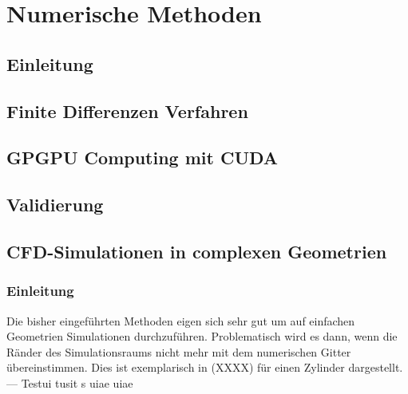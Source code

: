 \chapter{Numerische Methoden}
\section{Einleitung}
\section{Finite Differenzen Verfahren}
\section{GPGPU Computing mit CUDA}
\section{Validierung}
\section{CFD-Simulationen in complexen Geometrien}

\subsection{Einleitung}
Die bisher eingeführten Methoden eigen sich sehr gut um auf einfachen Geometrien Simulationen durchzuführen.
Problematisch wird es dann, wenn die Ränder des Simulationsraums nicht mehr mit dem numerischen Gitter übereinstimmen.
Dies ist exemplarisch in (XXXX) für einen Zylinder dargestellt.
---
Testui tusit s \cite{boyd2003nonlinear} uiae uiae
